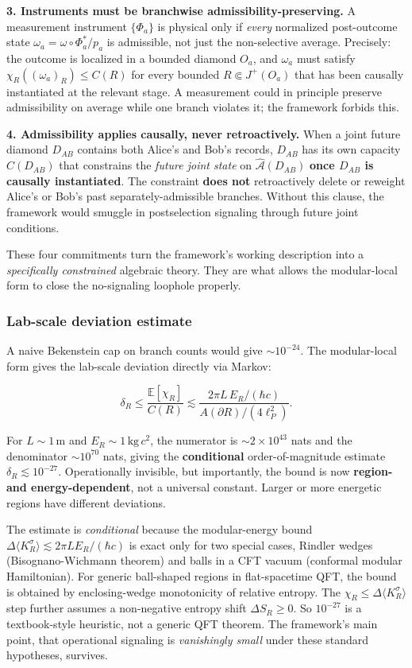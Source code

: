 \documentclass[11pt,a4paper]{article}
\begin{document}
\textbf{3. Instruments must be branchwise admissibility-preserving.} A measurement instrument $\{\Phi_a\}$ is physical only if \emph{every} normalized post-outcome state $\omega_a = \omega \circ \Phi_a^* / p_a$ is admissible, not just the non-selective average. Precisely: the outcome is localized in a bounded diamond $O_a$, and $\omega_a$ must satisfy $\chi_R((\omega_a)_R) \le C(R)$ for every bounded $R \Subset J^+(O_a)$ that has been causally instantiated at the relevant stage. A measurement could in principle preserve admissibility on average while one branch violates it; the framework forbids this.

\textbf{4. Admissibility applies causally, never retroactively.} When a joint future diamond $D_{AB}$ contains both Alice's and Bob's records, $D_{AB}$ has its own capacity $C(D_{AB})$ that constrains the \emph{future joint state} on $\hat{\mathcal{A}}(D_{AB})$ \textbf{once $D_{AB}$ is causally instantiated}. The constraint \textbf{does not} retroactively delete or reweight Alice's or Bob's past separately-admissible branches. Without this clause, the framework would smuggle in postselection signaling through future joint conditions.

These four commitments turn the framework's working description into a \emph{specifically constrained} algebraic theory. They are what allows the modular-local form to close the no-signaling loophole properly.

\subsubsection{Lab-scale deviation estimate}

A naive Bekenstein cap on branch counts would give $\sim 10^{-24}$. The modular-local form gives the lab-scale deviation directly via Markov:

\[
\delta_R \le \frac{\mathbb{E}[\chi_R]}{C(R)} \lesssim \frac{2\pi L \, E_R / (\hbar c)}{A(\partial R)/(4 \ell_P^2)}.
\]

For $L \sim 1\,\mathrm{m}$ and $E_R \sim 1\,\mathrm{kg}\,c^2$, the numerator is $\sim 2 \times 10^{43}$ nats and the denominator $\sim 10^{70}$ nats, giving the \textbf{conditional} order-of-magnitude estimate $\delta_R \lesssim 10^{-27}$. Operationally invisible, but importantly, the bound is now \textbf{region- and energy-dependent}, not a universal constant. Larger or more energetic regions have different deviations.

The estimate is \emph{conditional} because the modular-energy bound $\Delta\langle K_R^\sigma\rangle \lesssim 2\pi L E_R/(\hbar c)$ is exact only for two special cases, Rindler wedges (Bisognano-Wichmann theorem) and balls in a CFT vacuum (conformal modular Hamiltonian). For generic ball-shaped regions in flat-spacetime QFT, the bound is obtained by enclosing-wedge monotonicity of relative entropy. The $\chi_R \le \Delta\langle K_R^\sigma\rangle$ step further assumes a non-negative entropy shift $\Delta S_R \ge 0$. So $10^{-27}$ is a textbook-style heuristic, not a generic QFT theorem. The framework's main point, that operational signaling is \emph{vanishingly small} under these standard hypotheses, survives.
\end{document}
